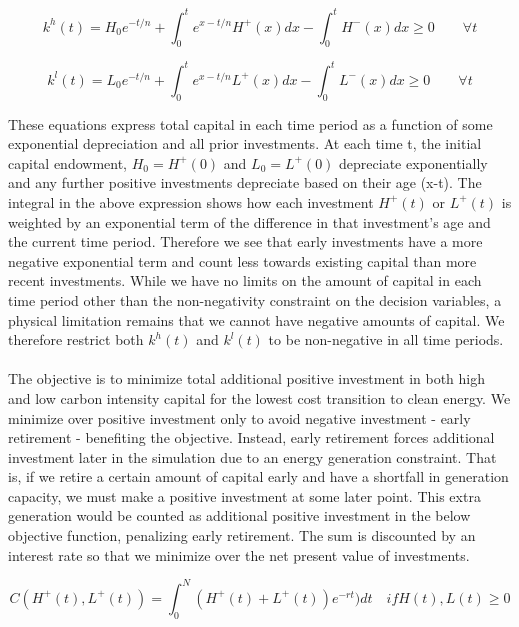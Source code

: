 \documentclass[singlespace]{easychithesis}
\begin{document}
\begin{equation}\label{eq:simpleHCapitalConstraint}
k^h(t) = H_0 e^{-t/n} + \int_0^t e^{x-t/n} H^+(x) dx - \int_0^t H^-(x)dx \geq 0 \qquad \forall t
\end{equation}

\begin{equation}\label{eq:simpleLCapitalConstraint}
k^l(t) = L_0 e^{-t/n} + \int_0^t e^{x-t/n} L^+(x) dx - \int_0^t L^-(x)dx \geq 0 \qquad \forall t
\end{equation}

These equations express total capital in each time period as a function of some exponential depreciation and all prior investments. At each time t, the initial capital endowment, $H_0 = H^+(0)$ and $L_0 = L^+(0)$ depreciate exponentially and any further positive investments depreciate based on their age (x-t). The integral in the above expression shows how each investment $H^+(t)$ or $L^+(t)$ is weighted by an exponential term of the difference in that investment's age and the current time period. Therefore we see that early investments have a more negative exponential term and count less towards existing capital than more recent investments. While we have no limits on the amount of capital in each time period other than the non-negativity constraint on the decision variables, a physical limitation remains that we cannot have negative amounts of capital. We therefore restrict both $k^h(t)$ and $k^l(t)$ to be non-negative in all time periods. 


\paragraph{} The objective is to minimize total additional positive investment in both high and low carbon intensity capital for the lowest cost transition to clean energy. We minimize over positive investment only to avoid negative investment - early retirement - benefiting the objective. Instead, early retirement forces additional investment later in the simulation due to an energy generation constraint. That is, if we retire a certain amount of capital early and have a shortfall in generation capacity, we must make a positive investment at some later point. This extra generation would be counted as additional positive investment in the below objective function, penalizing early retirement. The sum is discounted by an interest rate so that we minimize over the net present value of investments. 

\begin{equation}\label{eq:simpleObjective}
C(H^+(t), L^+(t)) = \int_0^N (H^+(t) + L^+(t))e^{-rt}) dt \quad if H(t), L(t) \geq 0
\end{equation}
\end{document}
